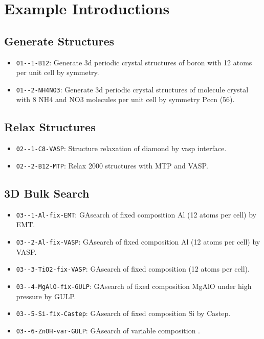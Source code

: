 \documentclass[12pt,oneside]{book}
\begin{document}
\section{Example Introductions}
\subsection{Generate Structures}\label{Generate Structures}
\begin{itemize}
\item \verb|01--1-B12|: Generate 3d periodic crystal structures of boron with 12 atoms per unit cell by symmetry.
\item \verb|01--2-NH4NO3|: Generate 3d periodic crystal structures of molecule crystal with 8 NH4 and NO3 molecules per unit cell by symmetry Pccn (56).
\end{itemize}

\subsection{Relax Structures}\label{Relax Structures}
\begin{itemize}
\item \verb|02--1-C8-VASP|: Structure relaxation of diamond by vasp interface. 
\item \verb|02--2-B12-MTP|: Relax 2000 structures with MTP and VASP.
\end{itemize}

\subsection{3D Bulk Search}\label{3D Bulk Search}
\begin{itemize}
\item \verb|03--1-Al-fix-EMT|: GAsearch of fixed composition Al (12 atoms per cell) by EMT.
\item \verb|03--2-Al-fix-VASP|: GAsearch of fixed composition Al (12 atoms per cell) by VASP.
\item \verb|03--3-TiO2-fix-VASP|: GAsearch of fixed composition  (12 atoms per cell).
\item \verb|03--4-MgAlO-fix-GULP|: GAsearch of fixed composition MgAlO under high pressure by GULP.
\item \verb|03--5-Si-fix-Castep|: GAsearch of fixed composition Si by Castep.
\item \verb|03--6-ZnOH-var-GULP|: GAsearch of variable composition .
\end{itemize}
\end{document}
